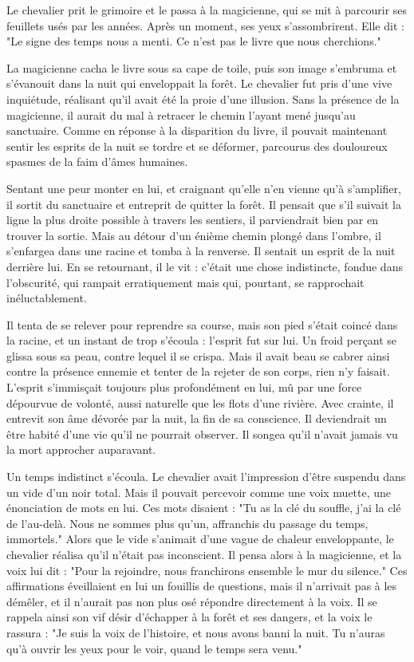 \documentclass[a4paper,11pt, openany]{book}
\begin{document}
Le chevalier prit le grimoire et le passa à la magicienne, qui se mit à parcourir ses feuillets usés par les années. Après un moment, ses yeux s'assombrirent. Elle dit :
"Le signe des temps nous a menti. Ce n'est pas le livre que nous cherchions."

La magicienne cacha le livre sous sa cape de toile, puis son image s'embruma et s'évanouit dans la nuit qui enveloppait la forêt.
Le chevalier fut pris d'une vive inquiétude, réalisant qu'il avait été la proie d'une illusion. 
Sans la présence de la magicienne, il aurait du mal à retracer le chemin l'ayant mené jusqu'au sanctuaire. 
Comme en réponse à la disparition du livre, il pouvait maintenant sentir les esprits de la nuit se tordre et se déformer, 
parcourus des douloureux spasmes de la faim d'âmes humaines. 

Sentant une peur monter en lui, et craignant qu'elle n'en vienne qu'à s'amplifier, 
il sortit du sanctuaire et entreprit de quitter la forêt.
Il pensait que s'il suivait la ligne la plus droite possible à travers les sentiers, il parviendrait bien par en trouver la sortie.
Mais au détour d'un énième chemin plongé dans l'ombre, il s'enfargea dans une racine et tomba à la renverse.
Il sentait un esprit de la nuit derrière lui. En se retournant, il le vit : c'était une chose indistincte, fondue dans l'obscurité, 
qui rampait erratiquement mais qui, pourtant, se rapprochait inéluctablement. 

Il tenta de se relever pour reprendre sa course, mais son pied s'était coincé dans la racine, et un instant de trop s'écoula : l'esprit fut sur lui.
Un froid perçant se glissa sous sa peau, contre lequel il se crispa. Mais il avait beau se cabrer ainsi contre la présence ennemie et tenter de la rejeter de son corps, rien n'y faisait.
L'esprit s'immisçait toujours plus profondément en lui, mû par une force dépourvue de volonté, aussi naturelle que les flots d'une rivière.
Avec crainte, il entrevit son âme dévorée par la nuit, la fin de sa conscience. Il deviendrait un être habité d'une vie qu'il ne pourrait observer.
Il songea qu'il n'avait jamais vu la mort approcher auparavant.

Un temps indistinct s'écoula. Le chevalier avait l'impression d'être suspendu dans un vide d'un noir total. Mais il pouvait percevoir comme une voix muette, une énonciation de mots en lui.
Ces mots disaient : "Tu as la clé du souffle, j'ai la clé de l'au-delà. Nous ne sommes plus qu'un, affranchis du passage du temps, immortels."
Alors que le vide s'animait d'une vague de chaleur enveloppante, le chevalier réalisa qu'il n'était pas inconscient. 
Il pensa alors à la magicienne, et la voix lui dit : "Pour la rejoindre, nous franchirons ensemble le mur du silence."
Ces affirmations éveillaient en lui un fouillis de questions, mais il n'arrivait pas à les démêler, et il n'aurait pas non plus osé répondre directement à la voix.
Il se rappela ainsi son vif désir d'échapper à la forêt et ses dangers, et la voix le rassura : "Je suis la voix de l'histoire, et nous avons banni la nuit. Tu n'auras qu'à ouvrir les yeux pour le voir, quand le temps sera venu."
\end{document}
